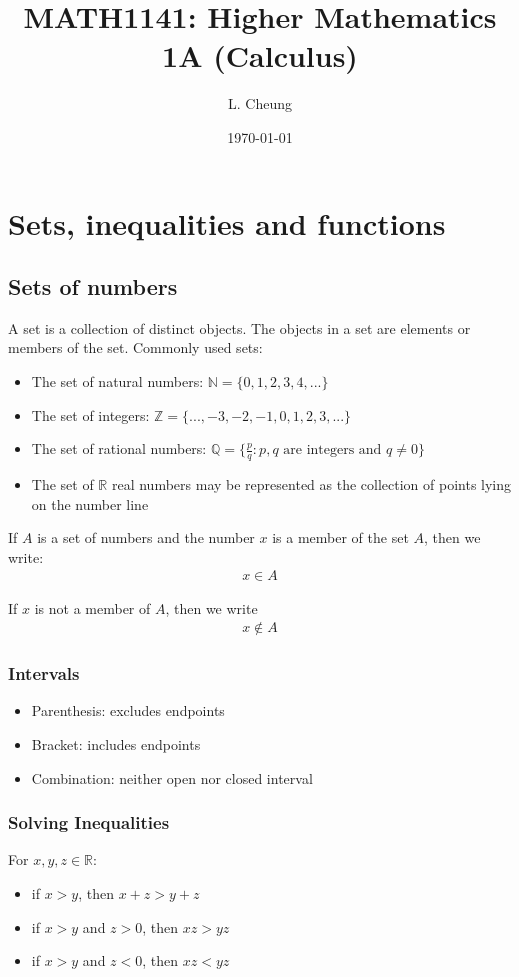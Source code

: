 \documentclass{report}
\title{\textbf{MATH1141: Higher Mathematics 1A (Calculus)}}
\author{L. Cheung}
\date{\today}
\begin{document}
\maketitle
\tableofcontents
\newpage

\chapter{Sets, inequalities and functions}
	\section{Sets of numbers}
		A \textcolor{pastel_blue}{set} is a collection of distinct objects. The objects in a set are elements or members of the set. Commonly used sets:
			\begin{itemize}
				\item The set of natural numbers: $\mathbb{N} = \{0, 1, 2, 3, 4,...\}$
				\item The set of integers: $\mathbb{Z} = \bigl\{...,-3,-2,-1,0,1,2,3,...\}$
				\item The set of rational numbers: $\mathbb{Q} = \{\frac{p}{q}: p,q \text{ are integers and } q \neq 0\}$
				\item The set of $\mathbb{R}$ real numbers may be represented as the collection of points lying on the number line
			\end{itemize}
		If $A$ is a set of numbers and the number $x$ is a member of the set $A$, then we write:
			\begin{align*}
				x \in A
			\end{align*}

		If $x$ is not a member of $A$, then we write
			\begin{align*}
				x \notin A
			\end{align*}


	\subsection{Intervals}
		\begin{itemize}
			\item Parenthesis: excludes endpoints
			\item Bracket: includes endpoints
			\item Combination: neither open nor closed interval
		\end{itemize}

	\subsection{Solving Inequalities}
		For $x, y, z \in \mathbb{R}$:
			\begin{itemize}
				\item if $x>y$, then $x+z>y+z$ 
				\item if $x>y$ and $z>0$, then $xz>yz$
				\item if $x>y$ and $z<0$, then $xz<yz$
			\end{itemize}
\end{document}
